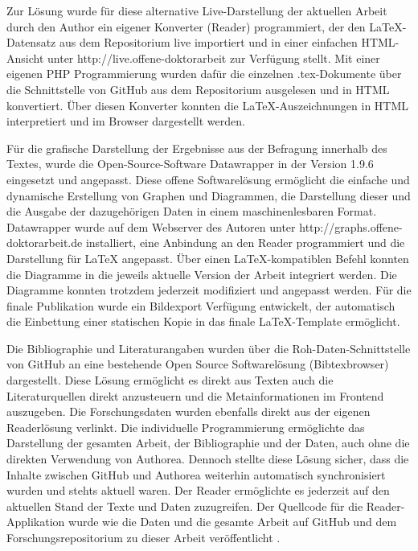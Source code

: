 Zur Lösung wurde für diese alternative Live-Darstellung der aktuellen Arbeit durch den Author ein eigener Konverter (Reader) programmiert, der den LaTeX-Datensatz aus dem Repositorium live importiert und in einer einfachen HTML-Ansicht unter http://live.offene-doktorarbeit zur Verfügung stellt. Mit einer eigenen PHP Programmierung wurden dafür die einzelnen .tex-Dokumente über die Schnittstelle von GitHub aus dem Repositorium ausgelesen und in HTML konvertiert. Über diesen Konverter konnten die LaTeX-Auszeichnungen in HTML interpretiert und im Browser dargestellt werden.

Für die grafische Darstellung der Ergebnisse aus der Befragung innerhalb des Textes, wurde die Open-Source-Software Datawrapper \cite{datawrapper_2015} in der Version 1.9.6 eingesetzt und angepasst. Diese offene Softwarelösung ermöglicht die einfache und dynamische Erstellung von Graphen und Diagrammen, die Darstellung dieser und die Ausgabe der dazugehörigen Daten in einem maschinenlesbaren Format. Datawrapper wurde auf dem Webserver des Autoren unter http://graphs.offene-doktorarbeit.de installiert, eine Anbindung an den Reader programmiert und die Darstellung für LaTeX angepasst. Über einen LaTeX-kompatiblen Befehl konnten die Diagramme in die jeweils aktuelle Version der Arbeit integriert werden. Die Diagramme konnten trotzdem jederzeit modifiziert und angepasst werden. Für die finale Publikation wurde ein Bildexport Verfügung entwickelt, der automatisch die Einbettung einer statischen Kopie in das finale LaTeX-Template ermöglicht.

Die Bibliographie und Literaturangaben wurden über die Roh-Daten-Schnittstelle von GitHub an eine bestehende Open Source Softwarelösung (Bibtexbrowser) dargestellt. Diese Lösung ermöglicht es direkt aus Texten auch die Literaturquellen direkt anzusteuern und die Metainformationen im Frontend auszugeben. Die Forschungsdaten wurden ebenfalls direkt aus der eigenen Readerlösung verlinkt. Die individuelle Programmierung ermöglichte das Darstellung der gesamten Arbeit, der Bibliographie und der Daten, auch ohne die direkten Verwendung von Authorea. Dennoch stellte diese Lösung sicher, dass die Inhalte zwischen GitHub und Authorea weiterhin automatisch synchronisiert wurden und stehts aktuell waren. Der Reader ermöglichte es jederzeit auf den aktuellen Stand der Texte und Daten zuzugreifen. Der Quellcode für die Reader-Applikation wurde wie die Daten und die gesamte Arbeit auf GitHub und dem Forschungsrepositorium zu dieser Arbeit veröffentlicht \cite{heise_2015_reader}.

